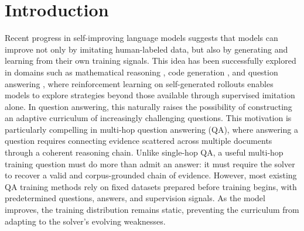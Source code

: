 \documentclass{article}
\begin{document}
\begin{abstract}
\end{abstract}



\section{Introduction}

Recent progress in self-improving language models \cite{ahmadian2024back, Spiral, Evolvesearch, zhao2026absolute, wang2025socratic} suggests that models can improve not only by imitating human-labeled data, but also by generating and learning from their own training signals. This idea has been successfully explored in domains such as mathematical reasoning \cite{huang2026rzero}, code generation \cite{wei2025toward}, and question answering \cite{chen2025self}, where reinforcement learning on self-generated rollouts enables models to explore strategies beyond those available through supervised imitation alone. In question answering, this naturally raises the possibility of constructing an adaptive curriculum of increasingly challenging questions.
This motivation is particularly compelling in multi-hop question answering (QA), where answering a question requires connecting evidence scattered across multiple documents through a coherent reasoning chain. Unlike single-hop QA, a useful multi-hop training question must do more than admit an answer: it must require the solver to recover a valid and corpus-grounded chain of evidence. However, most existing QA training methods rely on fixed datasets prepared before training begins, with predetermined questions, answers, and supervision signals. As the model improves, the training distribution remains static, preventing the curriculum from adapting to the solver's evolving weaknesses.
\end{document}
